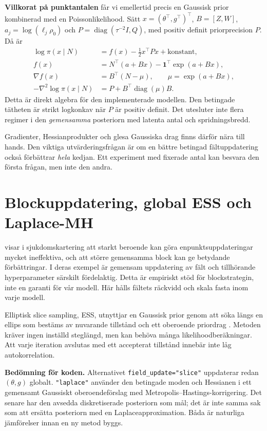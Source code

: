 \documentclass[11pt,a4paper]{article}
\begin{document}
\textbf{Villkorat på punktantalen} får vi emellertid precis en Gaussisk prior kombinerad med en Poissonlikelihood. Sätt $x=(\theta^\top,g^\top)^\top$, $B=[Z,W]$, $a_j=\log(\ell_j\rho_0)$ och $P=\operatorname{diag}(\tau^{-2}I,Q)$, med positiv definit priorprecision $P$. Då är
\begin{align}
 \log\pi(x\mid N)&=f(x)-\tfrac12x^\top Px+\text{konstant},\\
 f(x)&=N^\top(a+Bx)-\mathbf1^\top\exp(a+Bx),\\
 \nabla f(x)&=B^\top(N-\mu),\qquad \mu=\exp(a+Bx),\\
 -\nabla^2\log\pi(x\mid N)&=P+B^\top\operatorname{diag}(\mu)B.
\end{align}
Detta är direkt algebra för den implementerade modellen. Den betingade tätheten är strikt logkonkav när $P$ är positiv definit. Det utesluter inte flera regimer i den \emph{gemensamma} posteriorn med latenta antal och spridningsbredd.

Gradienter, Hessianprodukter och glesa Gaussiska drag finns därför nära till hands. Den viktiga utvärderingsfrågan är om en bättre betingad fältuppdatering också förbättrar \emph{hela} kedjan. Ett experiment med fixerade antal kan besvara den första frågan, men inte den andra.

\section{Blockuppdatering, global ESS och Laplace-MH}

\citet{knorrheld2002block} visar i sjukdomskartering att starkt beroende kan göra enpunktsuppdateringar mycket ineffektiva, och att större gemensamma block kan ge betydande förbättringar. I deras exempel är gemensam uppdatering av fält och tillhörande hyperparameter särskilt fördelaktig. Detta är empiriskt stöd för blockstrategin, inte en garanti för vår modell. Här hålls fältets räckvidd och skala fasta inom varje modell.

Elliptisk slice sampling, ESS, utnyttjar en Gaussisk prior genom att söka längs en ellips som bestäms av nuvarande tillstånd och ett oberoende priordrag \citep{murray2010elliptical}. Metoden kräver ingen inställd steglängd, men kan behöva många likelihoodberäkningar. Att varje iteration avslutas med ett accepterat tillstånd innebär inte låg autokorrelation.

\textbf{Bedömning för koden.} Alternativet \texttt{field\_update="slice"} uppdaterar redan $(\theta,g)$ globalt. \texttt{"laplace"} använder den betingade moden och Hessianen i ett gemensamt Gaussiskt oberoendeförslag med Metropolis--Hastings-korrigering. Det senare har den avsedda diskretiserade posteriorn som mål; det är inte samma sak som att ersätta posteriorn med en Laplaceapproximation. Båda är naturliga jämförelser innan en ny metod byggs.
\end{document}
